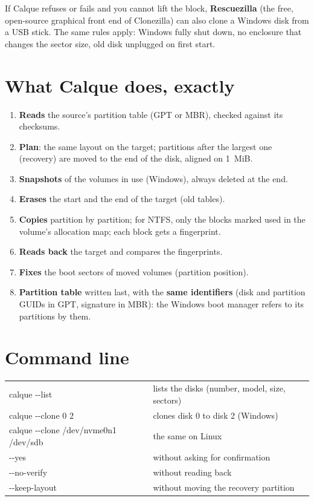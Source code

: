 If Calque refuses or fails and you cannot lift the block, \textbf{Rescuezilla} (the free, open-source
graphical front end of Clonezilla) can also clone a Windows disk from a USB stick. The same rules apply:
Windows fully shut down, no enclosure that changes the sector size, old disk unplugged on first start.

\section{What Calque does, exactly}

\begin{enumerate}
\item \textbf{Reads} the source's partition table (GPT or MBR), checked against its checksums.
\item \textbf{Plan}: the same layout on the target; partitions after the largest one (recovery) are moved
      to the end of the disk, aligned on 1~MiB.
\item \textbf{Snapshots} of the volumes in use (Windows), always deleted at the end.
\item \textbf{Erases} the start and the end of the target (old tables).
\item \textbf{Copies} partition by partition; for NTFS, only the blocks marked used in the volume's
      allocation map; each block gets a fingerprint.
\item \textbf{Reads back} the target and compares the fingerprints.
\item \textbf{Fixes} the boot sectors of moved volumes (partition position).
\item \textbf{Partition table} written last, with the \textbf{same identifiers} (disk and partition GUIDs
      in GPT, signature in MBR): the Windows boot manager refers to its partitions by them.
\end{enumerate}

\section{Command line}

\begin{tabular}{>{\ttfamily}l l}
calque -{}-list & lists the disks (number, model, size, sectors) \\
calque -{}-clone 0 2 & clones disk 0 to disk 2 (Windows) \\
calque -{}-clone /dev/nvme0n1 /dev/sdb & the same on Linux \\
\quad -{}-yes & without asking for confirmation \\
\quad -{}-no-verify & without reading back \\
\quad -{}-keep-layout & without moving the recovery partition \\
\end{tabular}


